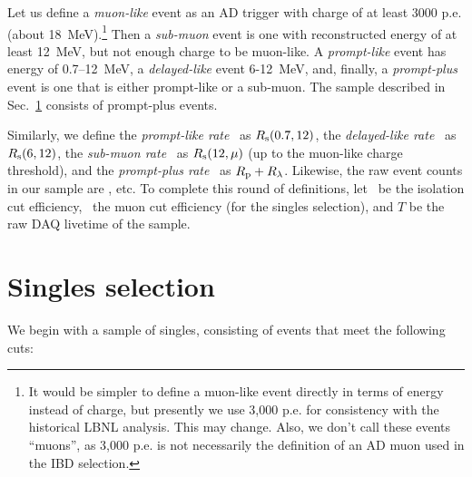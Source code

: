 \documentclass[../thesis.tex]{subfiles}
\begin{document}
Let us define a \emph{muon-like} event as an AD trigger with charge of at least
3000 p.e. (about 18~MeV).\footnote{It would be simpler to define a muon-like
  event directly in terms of energy instead of charge, but presently we use
  3,000 p.e. for consistency with the historical LBNL analysis. This may change.
  Also, we don't call these events ``muons'', as 3,000 p.e. is not necessarily
  the definition of an AD muon used in the IBD selection.} Then a
\emph{sub-muon} event is one with reconstructed energy of at least 12~MeV, but
not enough charge to be muon-like. A \emph{prompt-like} event has energy of
0.7--12~MeV, a \emph{delayed-like} event 6-12~MeV, and, finally, a
\emph{prompt-plus} event is one that is either prompt-like or a sub-muon. The
sample described in Sec.~\ref{sec:singsel} consists of prompt-plus events.

Similarly, we define the \emph{prompt-like rate} \Rpro\ as $R_\mathrm{s}(0.7, 12)$, the \emph{delayed-like rate} \Rdel\ as $R_\mathrm{s}(6, 12)$, the \emph{sub-muon rate} \Rsub\ as $R_\mathrm{s}(12, \mu)$ (up to the muon-like charge threshold), and the \emph{prompt-plus rate} \Rplu\ as $R_\mathrm{p} + R_\mathrm{\lambda}$. Likewise, the raw event counts in our sample are \Npro, etc. To complete this round of definitions, let \eisol\ be the isolation cut efficiency, \emu\ the muon cut efficiency (for the singles selection), and $T$ be the raw DAQ livetime of the sample.

\section{Singles selection}
\label{sec:singsel}

We begin with a sample of singles, consisting of events that meet the following cuts:

\end{document}
